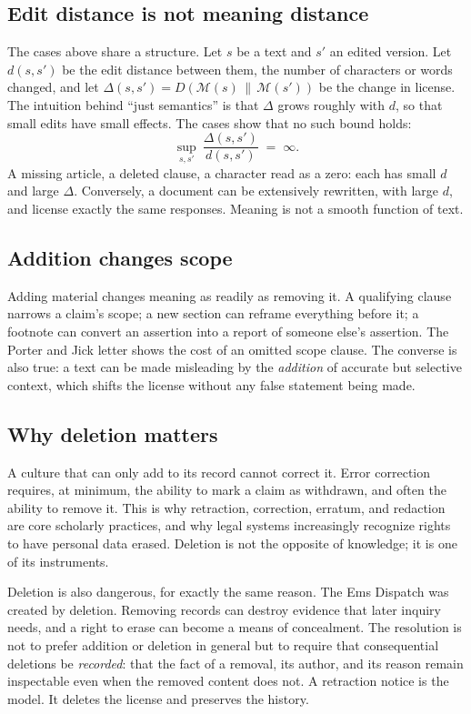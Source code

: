 \documentclass[11pt,a4paper]{article}
\theoremstyle{plain}
\theoremstyle{definition}
\theoremstyle{remark}
\newcommand{\M}{\mathcal{M}}
\begin{document}
\subsection{Edit distance is not meaning distance}

The cases above share a structure. Let $s$ be a text and $s'$ an edited version. Let $d(s,s')$ be the edit distance between them, the number of characters or words changed, and let $\Delta(s,s') = D(\M(s)\,\|\,\M(s'))$ be the change in license. The intuition behind ``just semantics'' is that $\Delta$ grows roughly with $d$, so that small edits have small effects. The cases show that no such bound holds:
\[
\sup_{s,s'}\ \frac{\Delta(s,s')}{d(s,s')} \;=\; \infty .
\]
A missing article, a deleted clause, a character read as a zero: each has small $d$ and large $\Delta$. Conversely, a document can be extensively rewritten, with large $d$, and license exactly the same responses. Meaning is not a smooth function of text.

\subsection{Addition changes scope}

Adding material changes meaning as readily as removing it. A qualifying clause narrows a claim's scope; a new section can reframe everything before it; a footnote can convert an assertion into a report of someone else's assertion. The Porter and Jick letter shows the cost of an omitted scope clause. The converse is also true: a text can be made misleading by the \emph{addition} of accurate but selective context, which shifts the license without any false statement being made.

\subsection{Why deletion matters}

A culture that can only add to its record cannot correct it. Error correction requires, at minimum, the ability to mark a claim as withdrawn, and often the ability to remove it. This is why retraction, correction, erratum, and redaction are core scholarly practices, and why legal systems increasingly recognize rights to have personal data erased. Deletion is not the opposite of knowledge; it is one of its instruments.

Deletion is also dangerous, for exactly the same reason. The Ems Dispatch was created by deletion. Removing records can destroy evidence that later inquiry needs, and a right to erase can become a means of concealment. The resolution is not to prefer addition or deletion in general but to require that consequential deletions be \emph{recorded}: that the fact of a removal, its author, and its reason remain inspectable even when the removed content does not. A retraction notice is the model. It deletes the license and preserves the history.
\end{document}
